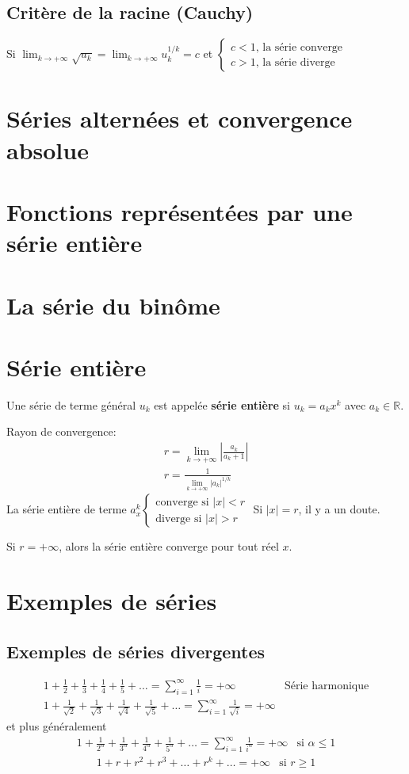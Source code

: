 \subsection{Critère de la racine (Cauchy)}
Si $\lim_{k\rightarrow+\infty}\sqrt{u_k}=\lim_{k\rightarrow+\infty}u_k^{1/k}=c$ et $\begin{cases}
	c<1\text{, la série converge}\\
	c>1\text{, la série diverge}
\end{cases}$
\section{Séries alternées et convergence absolue}
\section{Fonctions représentées par une série entière}
\section{La série du binôme}
\section{Série entière}
Une série de terme général $u_k$ est appelée \textbf{série entière} si $u_k=a_kx^k$ avec $a_k\in\mathbb R$.

Rayon de convergence: 
\begin{eqnarray}
	r=\lim_{k\rightarrow+\infty}\left|\frac{a_k}{a_k+1}\right|\\
	r=\frac{1}{\lim_{k\rightarrow+\infty}|a_k|^{1/k}}
\end{eqnarray}
La série entière de terme $a_x^k \begin{cases}
	\text{converge si }|x|<r\\
	\text{diverge si }|x|>r
\end{cases}$
Si $|x|=r$, il y a un doute.

Si $r=+\infty$, alors la série entière converge pour tout réel $x$.
\section{Exemples de séries}
\subsection{Exemples de séries divergentes}
\begin{eqnarray}
	1+\frac{1}{2}+\frac{1}{3}+\frac{1}{4}+\frac{1}{5}+\dots=\sum_{i=1}^\infty\frac{1}{i}=+\infty&\text{Série harmonique}\\
	1+\frac{1}{\sqrt 2}+\frac{1}{\sqrt 3}+\frac{1}{\sqrt 4}+\frac{1}{\sqrt 5}+\dots=\sum_{i=1}^\infty\frac{1}{\sqrt i}=+\infty
\end{eqnarray}
et plus généralement
\begin{eqnarray}
	1+\frac{1}{2^\alpha}+\frac{1}{3^\alpha}+\frac{1}{4^\alpha}+\frac{1}{5^\alpha}+\dots=\sum_{i=1}^\infty\frac{1}{i^\alpha}=+\infty&\text{si $\alpha\leq1$}
\end{eqnarray}
\begin{eqnarray}
	1+r+r^2+r^3+\dots+r^k+\dots=+\infty&\text{si $r\geq1$}
\end{eqnarray}
